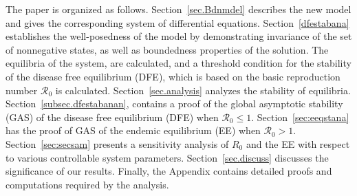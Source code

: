 \documentclass[a4paper]{article}
\begin{document}
\noindent 
The paper is organized as follows. Section~\ref{sec.Bdnmdel} describes the new model and gives the corresponding system of  differential equations.  Section~\ref{dfestabana} establishes the well-posedness of the model by demonstrating invariance of the set of nonnegative states, as well as boundedness properties of the solution. The equilibria of the system, are calculated, and a threshold condition for the stability of the disease free equilibrium (DFE), which is based on the basic reproduction number $\mathcal R_0$ is calculated.  
Section~\ref{sec.analysis} analyzes the stability of equilibria. Section~\ref{subsec.dfestabanan}, contains a proof of the global asymptotic stability (GAS) of the disease free equilibrium (DFE) when $\mathcal R_0\leqslant 1$. Section~\ref{sec:eeqstana} has the proof of GAS of the endemic equilibrium (EE) when $\mathcal R_0>1$. Section~\ref{sec:secsam} presents a sensitivity analysis of $R_0$ and the EE with respect to various controllable system parameters. Section~\ref{sec.discuss} discusses the significance of our results. Finally, the Appendix contains detailed proofs and computations required by the analysis.  
\end{document}
